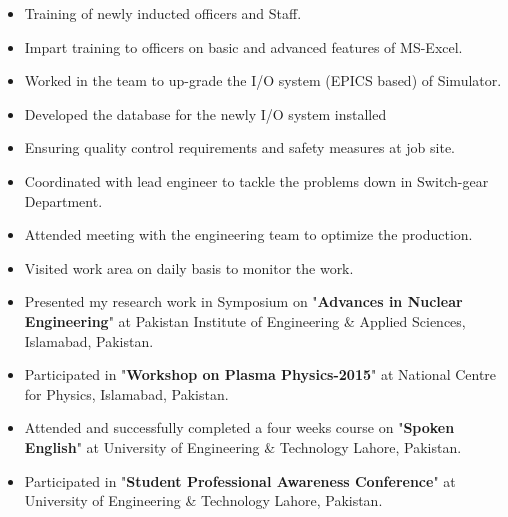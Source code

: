 \documentclass[10pt,a4paper]{altacv}
\begin{document}
\begin{itemize}
\item Training of newly inducted officers and Staff.
\item Impart training to officers on basic and advanced features of MS-Excel.
\item Worked in the team to up-grade the I/O system (EPICS based) of Simulator.
\item Developed the database for the newly I/O system installed
\item Ensuring quality control requirements and safety measures at job site.
\end{itemize}



\begin{itemize}
\item Coordinated with lead engineer to tackle the problems down in Switch-gear Department.
\item Attended meeting with the engineering team to optimize the production.
\item Visited work area on daily basis to monitor the work.
\end{itemize}



\begin{itemize}
\item Presented my research work in Symposium on "\textbf{Advances in Nuclear Engineering}" at Pakistan Institute of Engineering \& Applied Sciences, Islamabad, Pakistan.
\item Participated in "\textbf{Workshop on Plasma Physics-2015}" at National Centre for Physics, Islamabad, Pakistan.
\item Attended and successfully completed a four weeks course on "\textbf{Spoken English}" at University of Engineering \& Technology Lahore, Pakistan.
\item Participated in "\textbf{Student Professional Awareness Conference}" at University of Engineering \& Technology Lahore, Pakistan.
\end{itemize}






{}

{}
{}

\clearpage
\end{document}
